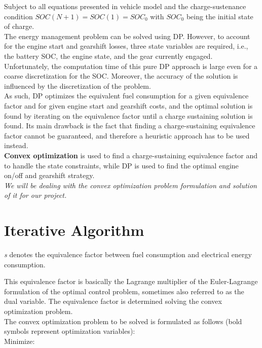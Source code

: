 \documentclass[conference]{IEEEtran}
\begin{document}
Subject to all equations presented in vehicle model and the charge-sustenance condition $SOC(N + 1) = SOC(1) = SOC_{0}$ with $SOC_{0}$ being the initial state of charge.\\
The energy management problem can be solved using DP. However, to account for the engine start
and gearshift losses, three state variables are required, i.e., the battery SOC, the engine state, and the
gear currently engaged. Unfortunately, the computation time of this pure DP approach is large even
for a coarse discretization for the SOC. Moreover, the accuracy of the solution is influenced by the
discretization of the problem.\\
As such, DP optimizes the equivalent fuel
consumption for a given equivalence factor and for given engine start and gearshift costs, and the optimal
solution is found by iterating on the equivalence factor until a charge sustaining solution is found.
Its main drawback is the fact that finding a charge-sustaining equivalence factor
cannot be guaranteed, and therefore a heuristic approach has to be used instead.\\
\textbf{Convex optimization} is used to find a charge-sustaining equivalence factor and to handle the state
constraints, while DP is used to find the optimal engine on/off and gearshift strategy.\\

\emph{We will be dealing with the convex optimization problem formulation and solution of it for our project.}
\section{\textbf{Iterative Algorithm}}

\emph{s} denotes the equivalence factor between fuel consumption and electrical energy consumption.

This equivalence factor is basically the Lagrange multiplier of the Euler-Lagrange formulation of the
optimal control problem, sometimes also referred to as the dual variable.
The equivalence factor is determined solving the convex optimization problem.\\
The convex optimization problem to be solved is formulated as follows (bold symbols represent optimization variables):\\
Minimize:
\end{document}
